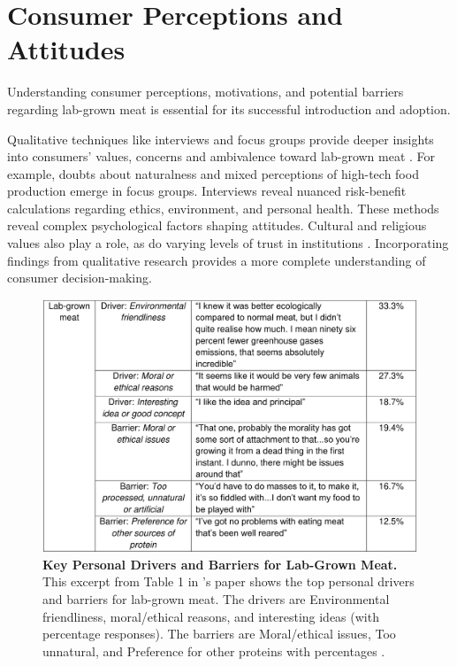 \documentclass[10pt]{article}
\begin{document}
\begin{sloppypar}
  \section{Consumer Perceptions and Attitudes}
  \label{sec:consumer-perceptions-and-attitudes}

  Understanding consumer perceptions, motivations, and potential barriers regarding lab-grown meat is essential for its successful introduction and adoption.

  Qualitative techniques like interviews and focus groups provide deeper insights into consumers’ values, concerns and ambivalence toward lab-grown meat \citep{laestadius_is_2015}. For example, doubts about naturalness and mixed perceptions of high-tech food production emerge in focus groups. Interviews reveal nuanced risk-benefit calculations regarding ethics, environment, and personal health. These methods reveal complex psychological factors shaping attitudes. Cultural and religious values also play a role, as do varying levels of trust in institutions \citep{al-kwifi_dynamics_2019}. Incorporating findings from qualitative research provides a more complete understanding of consumer decision-making.

  \begin{figure}[ht]
    \centering
    \includegraphics[width=\textwidth]{figures/excerpt-lab-grown-meat.png}
    \caption[Key Personal Drivers and Barriers for Lab-Grown Meat.]{\textbf{Key Personal Drivers and Barriers for Lab-Grown Meat.} This excerpt from Table 1 in \citeauthor{circus_exploring_2018} ’s paper shows the top personal drivers and barriers for lab-grown meat. The drivers are Environmental friendliness, moral/ethical reasons, and interesting ideas (with percentage responses). The barriers are Moral/ethical issues, Too unnatural, and Preference for other proteins with percentages \citep{circus_exploring_2018}.}
    \label{fig:consumer-survey}
  \end{figure}


\end{sloppypar}
\end{document}
